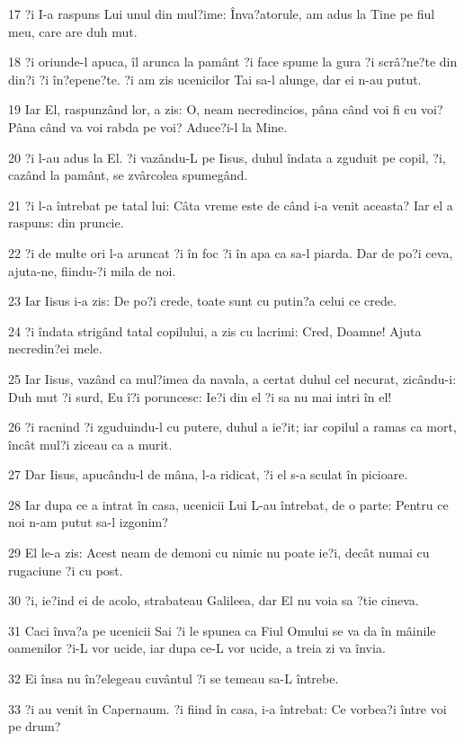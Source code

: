 \par 17 ?i I-a raspuns Lui unul din mul?ime: Înva?atorule, am adus la Tine pe fiul meu, care are duh mut.
\par 18 ?i oriunde-l apuca, îl arunca la pamânt ?i face spume la gura ?i scrâ?ne?te din din?i ?i în?epene?te. ?i am zis ucenicilor Tai sa-l alunge, dar ei n-au putut.
\par 19 Iar El, raspunzând lor, a zis: O, neam necredincios, pâna când voi fi cu voi? Pâna când va voi rabda pe voi? Aduce?i-l la Mine.
\par 20 ?i l-au adus la El. ?i vazându-L pe Iisus, duhul îndata a zguduit pe copil, ?i, cazând la pamânt, se zvârcolea spumegând.
\par 21 ?i l-a întrebat pe tatal lui: Câta vreme este de când i-a venit aceasta? Iar el a raspuns: din pruncie.
\par 22 ?i de multe ori l-a aruncat ?i în foc ?i în apa ca sa-l piarda. Dar de po?i ceva, ajuta-ne, fiindu-?i mila de noi.
\par 23 Iar Iisus i-a zis: De po?i crede, toate sunt cu putin?a celui ce crede.
\par 24 ?i îndata strigând tatal copilului, a zis cu lacrimi: Cred, Doamne! Ajuta necredin?ei mele.
\par 25 Iar Iisus, vazând ca mul?imea da navala, a certat duhul cel necurat, zicându-i: Duh mut ?i surd, Eu î?i poruncesc: Ie?i din el ?i sa nu mai intri în el!
\par 26 ?i racnind ?i zguduindu-l cu putere, duhul a ie?it; iar copilul a ramas ca mort, încât mul?i ziceau ca a murit.
\par 27 Dar Iisus, apucându-l de mâna, l-a ridicat, ?i el s-a sculat în picioare.
\par 28 Iar dupa ce a intrat în casa, ucenicii Lui L-au întrebat, de o parte: Pentru ce noi n-am putut sa-l izgonim?
\par 29 El le-a zis: Acest neam de demoni cu nimic nu poate ie?i, decât numai cu rugaciune ?i cu post.
\par 30 ?i, ie?ind ei de acolo, strabateau Galileea, dar El nu voia sa ?tie cineva.
\par 31 Caci înva?a pe ucenicii Sai ?i le spunea ca Fiul Omului se va da în mâinile oamenilor ?i-L vor ucide, iar dupa ce-L vor ucide, a treia zi va învia.
\par 32 Ei însa nu în?elegeau cuvântul ?i se temeau sa-L întrebe.
\par 33 ?i au venit în Capernaum. ?i fiind în casa, i-a întrebat: Ce vorbea?i între voi pe drum?
